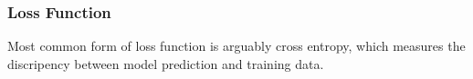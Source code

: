 \subsubsection{Loss Function}

Most common form of loss function is arguably cross entropy, which measures the discripency between model prediction and training data.